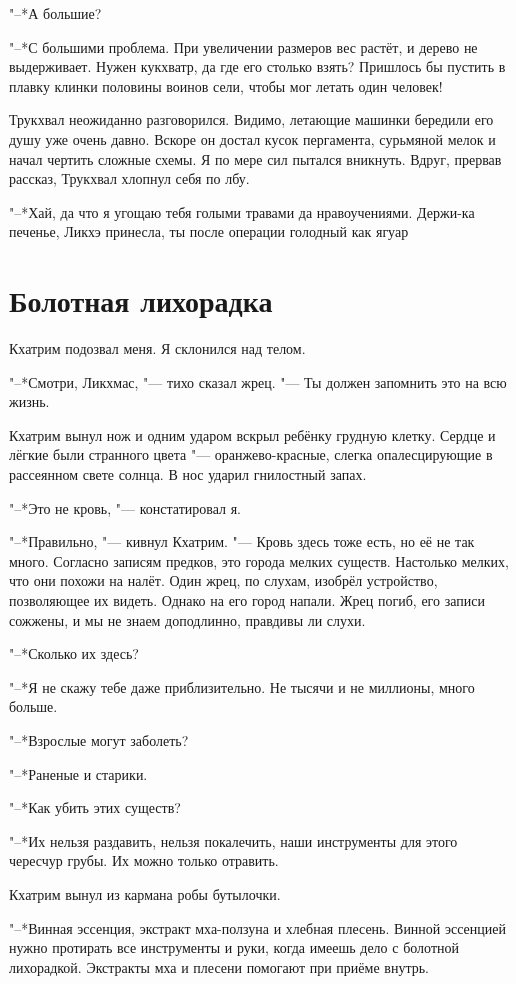\documentclass[a4paper,10pt]{book}
\newcommand{\ldotst}{\so{...}\xspace}
\begin{document}
"--*А большие?

"--*С большими проблема. При увеличении размеров вес растёт, и дерево не 
выдерживает. Нужен кукхватр, да где его столько взять? Пришлось бы пустить в 
плавку клинки половины воинов сели, чтобы мог летать один человек!

Трукхвал неожиданно разговорился. Видимо, летающие машинки бередили его душу 
уже очень давно. Вскоре он достал кусок пергамента, сурьмяной мелок и начал 
чертить сложные схемы. Я по мере сил пытался вникнуть. Вдруг, прервав рассказ,
Трукхвал хлопнул себя по лбу.

"--*Хай, да что я угощаю тебя голыми травами да нравоучениями. Держи-ка 
печенье, Ликхэ принесла, ты после операции голодный как ягуар\ldotst

\section{Болотная лихорадка}

Кхатрим подозвал меня. Я склонился над телом.

"--*Смотри, Ликхмас, "--- тихо сказал жрец. "--- Ты должен запомнить это на всю 
жизнь.

Кхатрим вынул нож и одним ударом вскрыл ребёнку грудную клетку. Сердце и лёгкие 
были странного цвета "--- оранжево-красные, слегка опалесцирующие в рассеянном 
свете солнца. В нос ударил гнилостный запах.

"--*Это не кровь, "--- констатировал я.

"--*Правильно, "--- кивнул Кхатрим. "--- Кровь здесь тоже есть, но её не так 
много. Согласно записям предков, это города мелких существ. Настолько мелких, 
что они похожи на налёт. Один жрец, по слухам, изобрёл устройство, 
позволяющее их видеть. Однако на его город напали. Жрец 
погиб, его записи сожжены, и мы не знаем доподлинно, правдивы ли слухи.

"--*Сколько их здесь?

"--*Я не скажу тебе даже приблизительно. Не тысячи и не миллионы, много больше.

"--*Взрослые могут заболеть?

"--*Раненые и старики.

"--*Как убить этих существ?

"--*Их нельзя раздавить, нельзя покалечить, наши инструменты для этого чересчур 
грубы. Их можно только отравить.

Кхатрим вынул из кармана робы бутылочки.

"--*Винная эссенция, 
экстракт мха-ползуна и хлебная плесень. Винной эссенцией нужно протирать все 
инструменты и руки, когда имеешь дело с болотной лихорадкой. Экстракты мха и 
плесени помогают при приёме внутрь.
\end{document}
